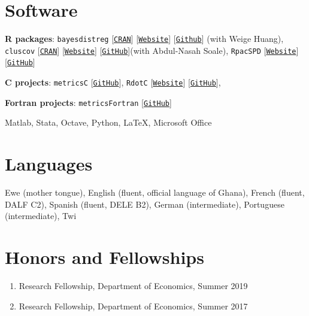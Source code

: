 \documentclass[12pt,letterpaper]{article}
\renewenvironment{itemize}{
  \begin{list}{}{
    \setlength{\leftmargin}{1.5em}
  }
}{
  \end{list}
}
\begin{document}
\section*{Software}
\begin{itemize}
  \item \textbf{R packages}: \texttt{bayesdistreg} [\texttt{\href{https://CRAN.R-project.org/package=bayesdistreg}{CRAN}}] [\texttt{\href{https://estsyawo.github.io/bayesdistreg/}{Website}}] [\texttt{\href{https://github.com/estsyawo/bayesdistreg}{Github}}] (with Weige Huang), \texttt{cluscov} [\texttt{\href{https://CRAN.R-project.org/package=cluscov}{CRAN}}] [\texttt{\href{https://estsyawo.github.io/cluscov/}{Website}}] [\texttt{\href{https://github.com/estsyawo/cluscov}{GitHub}}](with Abdul-Nasah Soale), \texttt{RpacSPD} [\texttt{\href{https://estsyawo.github.io/RpacSPD/}{Website}}] [\texttt{\href{https://github.com/estsyawo/RpacSPD}{GitHub}}]

  \item \textbf{C projects}: \texttt{metricsC} [\texttt{\href{https://github.com/estsyawo/metricsC}{GitHub}}], \texttt{RdotC} [\texttt{\href{https://estsyawo.github.io/RdotC/index.html}{Website}}] [\texttt{\href{https://github.com/estsyawo/RdotC}{GitHub}}], 
  
  \item \textbf{Fortran projects}: \texttt{metricsFortran} [\texttt{\href{https://github.com/estsyawo/metricsFortran}{GitHub}}]
  \item Matlab,  Stata, Octave, Python, \LaTeX, Microsoft Office
\end{itemize}

\section*{Languages}
Ewe (mother tongue), English (fluent, official language of Ghana), French (fluent, DALF C2), Spanish (fluent, DELE B2), German (intermediate),  Portuguese (intermediate), Twi%

\section*{Honors and Fellowships}
\begin{enumerate}
  \item Research Fellowship, Department of Economics, Summer 2019
  \item Research Fellowship, Department of Economics, Summer 2017
\end{enumerate}
\end{document}
